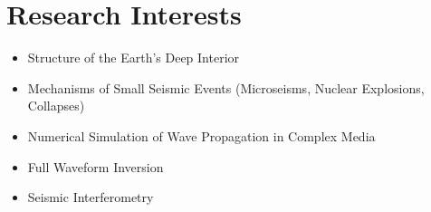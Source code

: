 \section*{Research Interests}

\begin{itemize}
\item Structure of the Earth's Deep Interior
\item Mechanisms of Small Seismic Events (Microseisms, Nuclear Explosions, Collapses)
\item Numerical Simulation of Wave Propagation in Complex Media
\item Full Waveform Inversion
\item Seismic Interferometry
\end{itemize}
